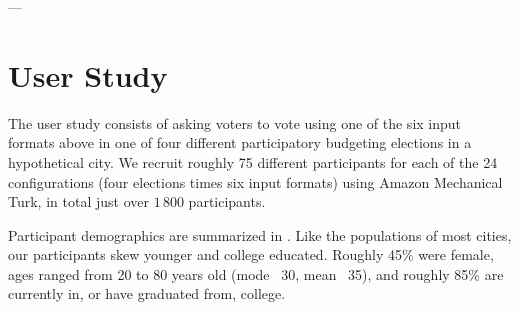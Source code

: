 \documentclass[mnsc,blindrev]{informs3_freeuse} %
\newcommand{\kibitz}[2]{\ifnum\Comments=1{\color{#1}{#2}}\fi}
\newcommand{\rf}[1]{\kibitz{blue}{[Roy says:#1]}}
\newcommand{\gb}[1]{\kibitz{red}{[GB:#1]}}
\newcommand{\mes}{ES}
\begin{document}
---









\section{User Study}\label{sec:description}


The user study consists of asking voters to vote using one of the six input formats above in one of four different participatory budgeting elections in a hypothetical city. 
We recruit roughly 75  different participants for each of the 24 configurations (four elections times six input formats)   using Amazon Mechanical Turk, in total  just over $1\,800$ participants.
   
Participant demographics are summarized in . Like the populations of most cities, our participants skew younger and college educated. Roughly 45\% were female, ages ranged from 20 to 80 years old (mode ~30, mean ~35), and roughly 85\% are currently in, or have graduated from, college. 
 
\end{document}

